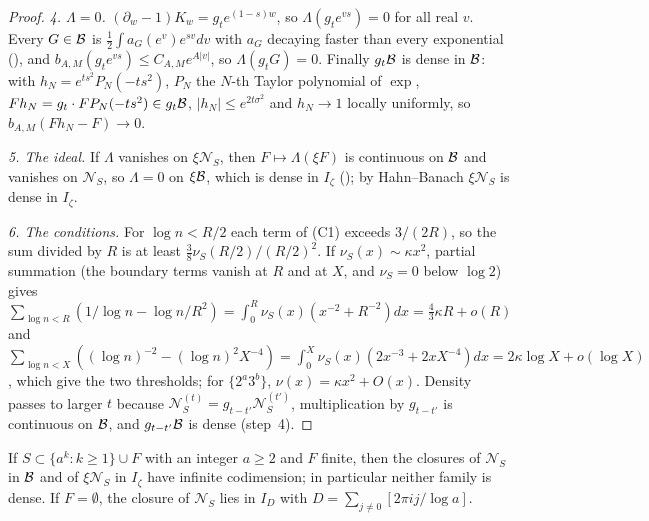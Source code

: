 \begin{proof}
\emph{4. $\Lambda=0$.} $(\partial_w-1)K_w=g_te^{(1-s)w}$, so $\Lambda(g_te^{vs})=0$ for all real $v$. Every $G\in\mathcal{B}$ is $\tfrac12\int a_G(e^v)e^{sv}dv$ with $a_G$ decaying faster than every exponential (), and $b_{A,M}(g_te^{vs})\le C_{A,M}e^{A|v|}$, so $\Lambda(g_tG)=0$. Finally $g_t\mathcal{B}$ is dense in $\mathcal{B}$: with $h_N=e^{ts^2}P_N(-ts^2)$, $P_N$ the $N$-th Taylor polynomial of $\exp$, $Fh_N=g_t\cdot FP_N(-ts^2)\in g_t\mathcal{B}$, $|h_N|\le e^{2t\sigma^2}$ and $h_N\to1$ locally uniformly, so $b_{A,M}(Fh_N-F)\to0$.

\emph{5. The ideal.} If $\Lambda$ vanishes on $\xi\mathcal{N}_S$, then $F\mapsto\Lambda(\xi F)$ is continuous on $\mathcal{B}$ and vanishes on $\mathcal{N}_S$, so $\Lambda=0$ on $\xi\mathcal{B}$, which is dense in $I_\zeta$ (); by Hahn--Banach $\xi\mathcal{N}_S$ is dense in $I_\zeta$.

\emph{6. The conditions.} For $\log n<R/2$ each term of (C1) exceeds $3/(2R)$, so the sum divided by $R$ is at least $\tfrac38\nu_S(R/2)/(R/2)^2$. If $\nu_S(x)\sim\kappa x^2$, partial summation (the boundary terms vanish at $R$ and at $X$, and $\nu_S=0$ below $\log2$) gives $\sum_{\log n<R}(1/\log n-\log n/R^2)=\int_0^R\nu_S(x)(x^{-2}+R^{-2})dx=\tfrac43\kappa R+o(R)$ and $\sum_{\log n<X}((\log n)^{-2}-(\log n)^2X^{-4})=\int_0^X\nu_S(x)(2x^{-3}+2xX^{-4})dx=2\kappa\log X+o(\log X)$, which give the two thresholds; for $\{2^a3^b\}$, $\nu(x)=\kappa x^2+O(x)$. Density passes to larger $t$ because $\mathcal{N}_S^{(t)}=g_{t-t'}\mathcal{N}_S^{(t')}$, multiplication by $g_{t-t'}$ is continuous on $\mathcal{B}$, and $g_{t-t'}\mathcal{B}$ is dense (step~4).
\end{proof}

\begin{proposition}\label{prop:NBfail}
If $S\subset\{a^k:k\ge1\}\cup F$ with an integer $a\ge2$ and $F$ finite, then the closures of $\mathcal{N}_S$ in $\mathcal{B}$ and of $\xi\mathcal{N}_S$ in $I_\zeta$ have infinite codimension; in particular neither family is dense. If $F=\emptyset$, the closure of $\mathcal{N}_S$ lies in $I_D$ with $D=\sum_{j\ne0}[2\pi ij/\log a]$.
\end{proposition}

